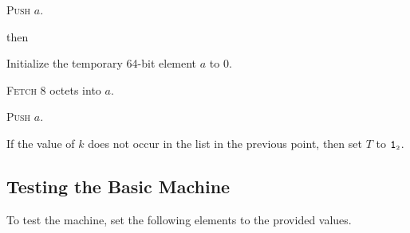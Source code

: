 \documentclass[a4paper,12pt]{article}
\newcommand{\num}[1]{\texttt{#1}}
\newcommand{\hex}[1]{\num{#1}_{\textup{\tiny 16}}}
\newcommand{\bin}[1]{\num{#1}_{\textup{\tiny 2}}}
\newcommand{\TERM}{T}
\newcommand{\T}{\bin{1}}
\newcommand{\proc}[1]{\textsc{#1}}
\newcommand{\op}[1]{$#1$}
\newcommand{\PUSHL}     [1]{\op{\hex{0B}}}
\begin{document}
\begin{stepnumbers}
\begin{description}
\begin{stepnumbers}
    \item \proc{Push} $a$.
    \end{stepnumbers}
  \item[\PUSHL{}] then
    \begin{stepnumbers}
    \item Initialize the temporary 64-bit element $a$ to 0.
    \item \proc{Fetch} 8 octets into $a$.
    \item \proc{Push} $a$.
    \end{stepnumbers}
  \end{description}
\item If the value of $k$ does not occur in the list in the previous point, then set $\TERM$ to $\T$.
\end{stepnumbers}

\subsection{Testing the Basic Machine}

To test the machine, set the following elements to the provided values.
\end{document}
